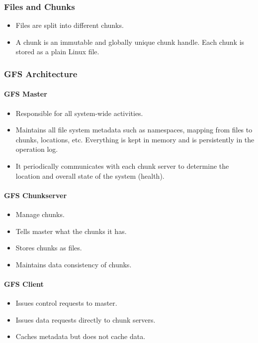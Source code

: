 \documentclass[12pt]{article}
\begin{document}
\subsubsection{Files and Chunks}
\begin{itemize}
    \item Files are split into different chunks.
    \item A chunk is an immutable and globally unique chunk handle. Each chunk is stored as a plain Linux file.
\end{itemize}

\subsubsection{GFS Architecture}
\paragraph{GFS Master}
\begin{itemize}
    \item Responsible for all system-wide activities.
    \item Maintains all file system metadata such as namespaces, mapping from files to chunks, locations, etc. Everything is kept in memory and is persistently in the operation log.
    \item It periodically communicates with each chunk server to determine the location and overall state of the system (health).
\end{itemize}

\paragraph{GFS Chunkserver}
\begin{itemize}
    \item Manage chunks.
    \item Tells master what the chunks it has.
    \item Stores chunks as files.
    \item Maintains data consistency of chunks.
\end{itemize}

\paragraph{GFS Client}
\begin{itemize}
    \item Issues control requests to master.
    \item Issues data requests directly to chunk servers.
    \item Caches metadata but does not cache data.
\end{itemize}
\end{document}
